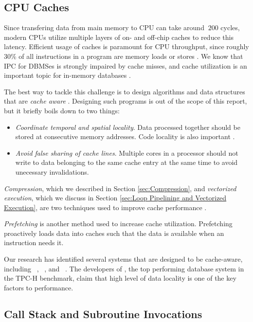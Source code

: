 \subsection{CPU Caches}
\label{sub:CPU Caches}
Since transfering data from main memory to CPU can take around $~200$ cycles, modern CPUs utilize multiple layers of on- and off-chip caches to reduce this latency. Efficient usage of caches is paramount for CPU throughput, since roughly 30\% of all instructions in a program are memory loads or stores \cite{Boncz2005-wj}. We know that IPC for DBMSes is strongly impaired by cache misses, and cache utilization is an important topic for in-memory databases \cite{Exasol2014-xh}.

The best way to tackle this challenge is to design algorithms and data structures that are \textit{cache aware} \cite{Farber2012-vh}. Designing such programs is out of the scope of this report, but it briefly boils down to two things:
\begin{itemize}
  \item \textit{Coordinate temporal and spatial locality}. Data processed together should be stored at consecutive memory addresses. Code locality is also important \cite{Neumann2011-uq}.
  \item \textit{Avoid false sharing of cache lines}. Multiple cores in a processor should not write to data belonging to the same cache entry at the same time to avoid unecessary invalidations.
\end{itemize}
\textit{Compression}, which we described in Section \ref{sec:Compression}, and \textit{vectorized execution}, which we discuss in Section \ref{sec:Loop Pipelining and Vectorized Execution}, are two techniques used to improve cache performance \cite{Larson2013-mc, Lemke2010-is}.

\textit{Prefetching} is another method used to increase cache utilization. Prefetching proactively loads data into caches such that the data is available when an instruction needs it.

Our research has identified several systems that are designed to be cache-aware, including \monetdb~\cite{Boncz2002-yj}, \mssql~\cite{Lahiri2015-mz}, and \ibm~\cite{Raman2013-em}. The developers of \exasol, the top performing database system in the TPC-H benchmark, claim that high level of data locality is one of the key factors to performance.

\subsection{Call Stack and Subroutine Invocations}
\label{sub:Call Stack and Subroutine Invocations}

